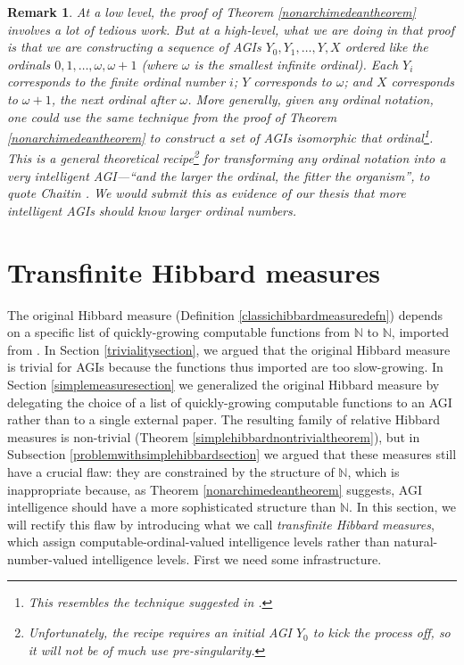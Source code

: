 \documentclass{article}
\newtheorem{remark}[theorem]{Remark}
\begin{document}
\begin{remark}
    At a low level, the proof of Theorem \ref{nonarchimedeantheorem} involves a
    lot of tedious work. But at a high-level, what we are doing in that proof is
    that we are constructing a sequence of AGIs $Y_0,Y_1,\ldots,Y,X$
    ordered like the ordinals $0,1,\ldots,\omega,\omega+1$
    (where $\omega$ is the smallest infinite ordinal).
    Each $Y_i$ corresponds to the finite ordinal number $i$; $Y$ corresponds to $\omega$;
    and $X$ corresponds to $\omega+1$, the next
    ordinal after $\omega$. More generally, given any ordinal notation, one could
    use the same technique from the proof of Theorem \ref{nonarchimedeantheorem} to
    construct a set of AGIs isomorphic that ordinal\footnote{This
    resembles the technique suggested in \cite{good1969godel}.}.
    This is a general theoretical
    recipe\footnote{Unfortunately,
    the recipe requires an initial AGI $Y_0$ to kick the process off, so it will not be
    of much use pre-singularity.} for transforming any ordinal notation into a very intelligent
    AGI---``and the larger the ordinal, the fitter the organism'',
    to quote Chaitin \cite{chaitin}.
    We would submit this as evidence of our thesis
    \cite{ioi1} \cite{ioi2} that more intelligent AGIs should know larger ordinal numbers.
\end{remark}


\section{Transfinite Hibbard measures}
\label{transfinitehibbardsection}

The original Hibbard measure
(Definition \ref{classichibbardmeasuredefn}) depends on a specific list of
quickly-growing computable functions from $\mathbb N$ to $\mathbb N$, imported from
\cite{liu1960enumeration}. In Section \ref{trivialitysection}, we argued
that the original Hibbard measure is trivial for AGIs because the functions thus imported
are too slow-growing.
In Section \ref{simplemeasuresection} we generalized
the original Hibbard measure
by delegating the choice of a list of quickly-growing computable functions to an AGI rather
than to a single external paper. The resulting family of relative Hibbard measures is
non-trivial (Theorem \ref{simplehibbardnontrivialtheorem}), but in
Subsection \ref{problemwithsimplehibbardsection} we argued that these
measures still have a crucial flaw: they are constrained by the structure of
$\mathbb N$, which is inappropriate because, as Theorem \ref{nonarchimedeantheorem}
suggests, AGI intelligence should have a more sophisticated structure than $\mathbb N$.
In this section, we will rectify this flaw by introducing what we call \emph{transfinite
Hibbard measures}, which assign computable-ordinal-valued intelligence levels rather than
natural-number-valued intelligence levels. First we need some infrastructure.
\end{document}

